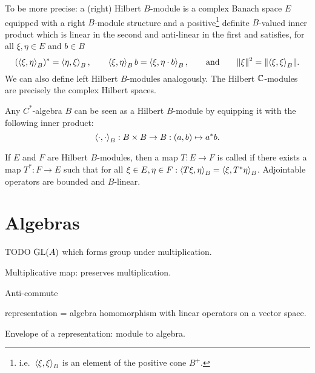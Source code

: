 To be more precise: a (right) Hilbert $B$-module is a complex Banach space $E$ equipped with a right $B$-module structure and a positive\footnote{i.e.\ $\left\langle \xi, \xi \right\rangle_B$ is an element of the positive cone $B^+$.} definite $B$-valued inner product which is linear in the second and anti-linear in the first and satisfies, for all $\xi,\eta \in E$ and $b\in B$
\[ (\left\langle \xi,\eta \right\rangle_B)^* = \left\langle \eta,\xi \right\rangle_B, \qquad \left\langle \xi, \eta \right\rangle_B b = \left\langle \xi,\eta\cdot b \right\rangle_B, \qquad \text{and} \qquad \lVert\xi\rVert^2 = \lVert\left\langle \xi,\xi \right\rangle_B\rVert. \]
We can also define left Hilbert $B$-modules analogously. The Hilbert $\mathbb{C}$-modules are precisely the complex Hilbert spaces.

Any $C^*$-algebra $B$ can be seen as a Hilbert $B$-module by equipping it with the following inner product:
\[ \left\langle \cdot, \cdot \right\rangle_B: B\times B\to B: (a,b) \mapsto a^*b. \]

If $E$ and $F$ are Hilbert $B$-modules, then a map $T: E \to F$ is called  if there exists a map $T^*: F \to E$ such that for all $\xi\in E, \eta\in F: \left\langle T\xi,\eta \right\rangle_B = \left\langle \xi, T^*\eta \right\rangle_B$. Adjointable operators are bounded and $B$-linear.



\chapter{Algebras}
TODO $\operatorname{GL}(A)$ which forms group under multiplication.

Multiplicative map: preserves multiplication.

Anti-commute

representation = algebra homomorphism with linear operators on a vector space.

Envelope of a representation: module to algebra.

